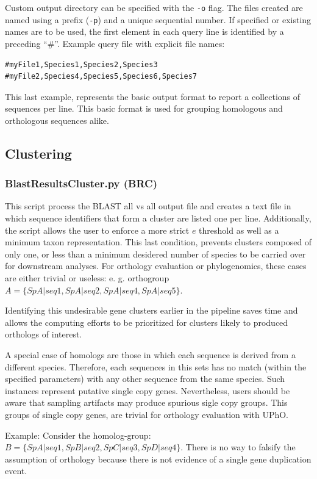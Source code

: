 \documentclass[10pt]{article}
\begin{document}
Custom output directory can be specified with the \texttt{-o} flag.
The files created are named using a prefix (\texttt{-p}) and
a unique sequential number. If specified or existing names are to be
used, the first element in each query line is identified by a
preceding ``\#''.
Example query file with explicit file names:
\begin{verbatim} 
#myFile1,Species1,Species2,Species3
#myFile2,Species4,Species5,Species6,Species7
\end{verbatim}

This last example, represents the basic output format to report a collections of 
sequences per line. This basic format is used for grouping homologous and orthologous sequences  alike. 

\subsection{Clustering}

\subsubsection{BlastResultsCluster.py (BRC)} This script process
the BLAST all vs all output file and creates a text file in which
sequence identifiers that form a cluster are listed one per
line. Additionally, the script allows the user to enforce a more
strict $e$ threshold as well as a minimum taxon representation. This
last condition, prevents clusters composed of only one, or less than a
minimum desidered number of species to be carried over for downstream
analyses. For orthology evaluation or phylogenomics, these cases are
either trivial or useless: e. g. orthogroup $A=\{SpA|seq1,
SpA|seq2,SpA|seq4, SpA|seq5\}$.

Identifying this undesirable gene clusters earlier in the pipeline
saves time and allows the computing efforts to be prioritized for
clusters likely to produced orthologs of interest.

A special case of homologs are those in which each sequence is derived
from a different species. Therefore, each sequences in this sets has no
match (within the specified parameters) with any other sequence from
the same species. Such instances represent putative single copy
genes. Nevertheless, users should be aware that sampling artifacts may
produce spurious sigle copy groups. This groups of single copy genes,
are trivial for orthology evaluation with UPhO.

Example: Consider the homolog-group: $B=\{SpA|seq1, SpB|seq2,
SpC|seq3,SpD|seq4\}$.  There is no way to falsify the assumption of
orthology because there is not evidence of a single gene duplication
event.
\end{document}
